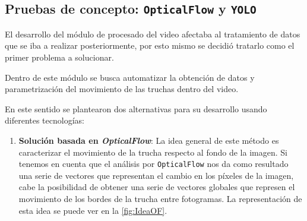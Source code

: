 \subsection{Pruebas de concepto: \texttt{OpticalFlow} y \texttt{YOLO}}

El desarrollo del módulo de procesado del video afectaba al tratamiento de datos que se iba a realizar posteriormente, por esto mismo se decidió 
tratarlo como el primer problema a solucionar.

Dentro de este módulo se busca automatizar la obtención de datos y parametrización del movimiento de las truchas dentro del video.

En este sentido se plantearon dos alternativas para su desarrollo usando diferentes tecnologías:

\begin{enumerate}
    \item \textbf{Solución basada en \textit{OpticalFlow}}: La idea general de este método es caracterizar el movimiento de la trucha respecto al 
    fondo de la imagen.\newline
    Si tenemos en cuenta que el análisis por \texttt{OpticalFlow} nos da como resultado una serie de vectores que representan el cambio en los 
    píxeles de la imagen, cabe la posibilidad de obtener una serie de vectores globales que represen el movimiento de los bordes de la trucha entre fotogramas. 
    La representación de esta idea se puede ver en la \autoref{fig:IdeaOF}.


\end{enumerate}
